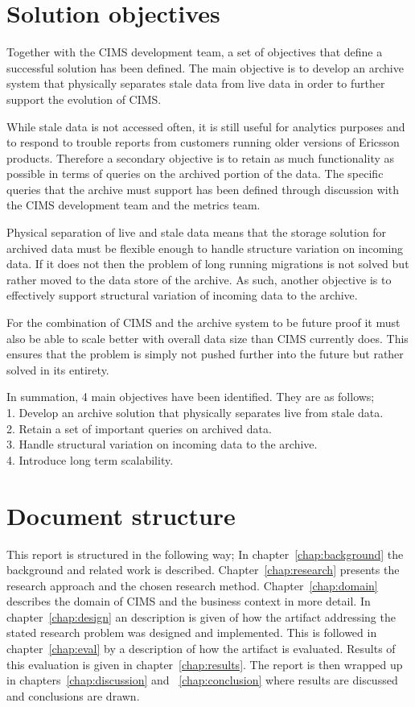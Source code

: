 \section{Solution objectives}
Together with the CIMS development team, a set of objectives that define a successful solution has been defined. The main objective is to develop an archive system that physically separates stale data from live data in order to further support the evolution of CIMS.

While stale data is not accessed often, it is still useful for analytics purposes and to respond to trouble reports from customers running older versions of Ericsson products. Therefore a secondary objective is to retain as much functionality as possible in terms of queries on the archived portion of the data. The specific queries that the archive must support has been defined through discussion with the CIMS development team and the metrics team.

Physical separation of live and stale data means that the storage solution for archived data must be flexible enough to handle structure variation on incoming data. If it does not then the problem of long running migrations is not solved but rather moved to the data store of the archive. As such, another objective is to effectively support structural variation of incoming data to the archive.

For the combination of CIMS and the archive system to be future proof it must also be able to scale better with overall data size than CIMS currently does. This ensures that the problem is simply not pushed further into the future but rather solved in its entirety.

In summation, 4 main objectives have been identified. They are as follows;\\
1. Develop an archive solution that physically separates live from stale data.\\
2. Retain a set of important queries on archived data.\\
3. Handle structural variation on incoming data to the archive.\\
4. Introduce long term scalability. \\

\section{Document structure}
This report is structured in the following way; In chapter~\ref{chap:background} the background and related work is described. Chapter~\ref{chap:research} presents the research approach and the chosen research method. Chapter~\ref{chap:domain} describes the domain of CIMS and the business context in more detail. In chapter~\ref{chap:design} an description is given of how the artifact addressing the stated research problem was designed and implemented.
This is followed in chapter~\ref{chap:eval} by a description of how the artifact is evaluated. Results of this evaluation is given in chapter~\ref{chap:results}. The report is then wrapped up in chapters~\ref{chap:discussion} and  ~\ref{chap:conclusion} where results are discussed and conclusions are drawn.

